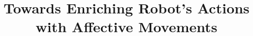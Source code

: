\documentclass{sig-alternate-05-2015}
\begin{document}



%

\title{Towards Enriching Robot's Actions with Affective Movements}
%
%
%
%
%
\end{document}
